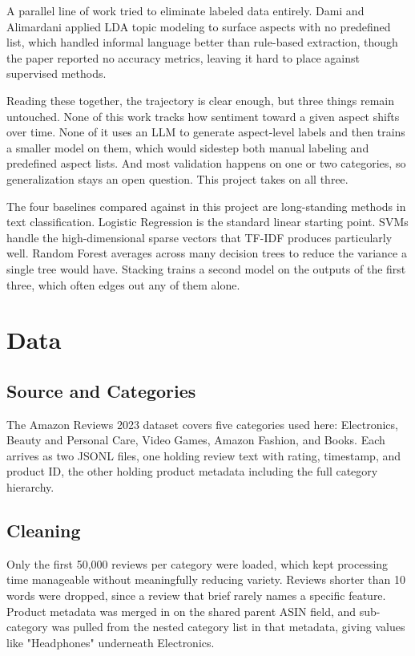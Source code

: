 \documentclass[sigconf]{acmart}
\begin{document}
A parallel line of work tried to eliminate labeled data entirely. Dami and Alimardani \cite{dami2024} applied LDA topic modeling to surface aspects with no predefined list, which handled informal language better than rule-based extraction, though the paper reported no accuracy metrics, leaving it hard to place against supervised methods.

Reading these together, the trajectory is clear enough, but three things remain untouched. None of this work tracks how sentiment toward a given aspect shifts over time. None of it uses an LLM to generate aspect-level labels and then trains a smaller model on them, which would sidestep both manual labeling and predefined aspect lists. And most validation happens on one or two categories, so generalization stays an open question. This project takes on all three.

The four baselines compared against in this project are long-standing methods in text classification. Logistic Regression is the standard linear starting point. SVMs handle the high-dimensional sparse vectors that TF-IDF produces particularly well. Random Forest averages across many decision trees to reduce the variance a single tree would have. Stacking trains a second model on the outputs of the first three, which often edges out any of them alone.

\section{Data}

\subsection{Source and Categories}
The Amazon Reviews 2023 dataset covers five categories used here: Electronics, Beauty and Personal Care, Video Games, Amazon Fashion, and Books. Each arrives as two JSONL files, one holding review text with rating, timestamp, and product ID, the other holding product metadata including the full category hierarchy.

\subsection{Cleaning}
Only the first 50,000 reviews per category were loaded, which kept processing time manageable without meaningfully reducing variety. Reviews shorter than 10 words were dropped, since a review that brief rarely names a specific feature. Product metadata was merged in on the shared parent ASIN field, and sub-category was pulled from the nested category list in that metadata, giving values like "Headphones" underneath Electronics.
\end{document}
